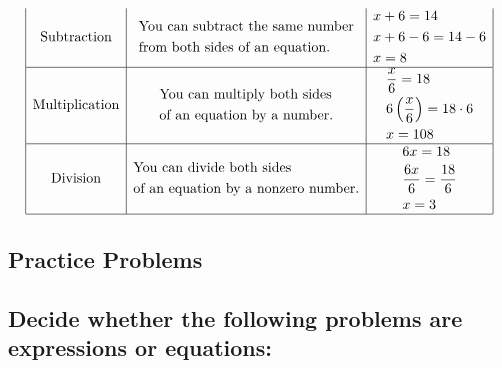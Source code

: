\[\begin{array}{|c|c|c|}
\text{Subtraction} &
\begin{aligned}
&\text{You can subtract the same number}\\
&\text{from both sides of an equation.}
\end{aligned}
&
\begin{aligned}
&x + 6 = 14\\
&x + 6 - 6 = 14 - 6\\
&x = 8
\end{aligned}
\\ \hline

\text{Multiplication} &
\begin{aligned}
&\text{You can multiply both sides}\\
&\text{of an equation by a number.}
\end{aligned}
&
\begin{aligned}
&\frac{x}{6} = 18\\
&6\left(\frac{x}{6}\right) = 18 \cdot 6\\
&x = 108
\end{aligned}
\\ \hline

\text{Division} &
\begin{aligned}
&\text{You can divide both sides}\\
&\text{of an equation by a nonzero number.}
\end{aligned}
&
\begin{aligned}
&6x = 18\\
&\frac{6x}{6} = \frac{18}{6}\\
&x = 3
\end{aligned}
\\ \hline

\end{array}
\]





\subsection{Practice Problems}
\label{sss:prac-fe87}





\subsection{Decide whether the following problems are expressions or equations:}
\label{sss:deci-2683}




